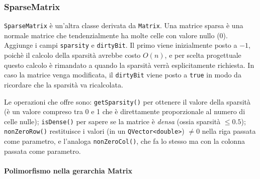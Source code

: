 \subsubsection{SparseMatrix}
\texttt{SparseMatrix} è un'altra classe derivata da \texttt{Matrix}. Una matrice sparsa è una normale matrice
che tendenzialmente ha molte celle con valore nullo (0). Aggiunge i campi \texttt{sparsity} e 
\texttt{dirtyBit}. Il primo viene inizialmente posto a $-1$, poichè il calcolo della sparsità avrebbe costo $O(n)$,
e per scelta progettuale questo calcolo è rimandato a quando la sparsità verrà esplicitamente richiesta. 
In caso la matrice venga modificata, il \texttt{dirtyBit} viene posto a \texttt{true} in modo da ricordare che
la sparsità va ricalcolata.\par
Le operazioni che offre sono: \texttt{getSparsity()} per ottenere il valore della sparsità (è un valore compreso tra 0 e 1 che è direttamente proporzionale al numero di celle nulle); \texttt{isDense()}
per sapere se la matrice è \emph{densa} (ossia sparsità $\leq 0.5$); \texttt{nonZeroRow()} restituisce i valori
(in un \texttt{QVector<double>}) $\neq 0$ nella riga passata come parametro, e l'analoga \texttt{nonZeroCol()},
che fa lo stesso ma con la colonna passata come parametro.

\paragraph*{Polimorfismo nella gerarchia Matrix}

